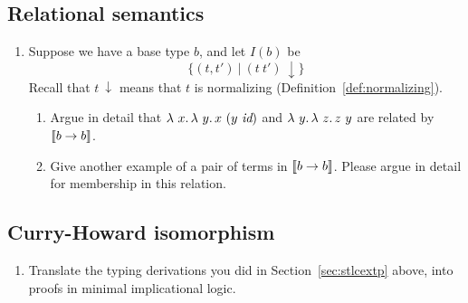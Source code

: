 \subsection{Relational semantics}

\begin{enumerate}
\item Suppose we have a base type $b$, and let $I(b)$ be
  \[
  \{ (t,t')\ |\ (t\ t')\ \downarrow \}
  \]
  \noindent Recall that $t\ \downarrow$ means that $t$ is normalizing (Definition~\ref{def:normalizing}).

  \begin{enumerate}
  \item Argue in detail that $\lambda\ x.\, \lambda\ y.\, x\ (y\ \textit{id})$ and $\lambda\ y.\, \lambda\ z.\, z\ y$
    are related by $\llbracket b \to b \rrbracket$.

  \item Give another example of a pair of terms in $\llbracket b \to b \rrbracket$.  Please argue in detail for membership in this relation.
  \end{enumerate}
\end{enumerate}

\subsection{Curry-Howard isomorphism}

\begin{enumerate}
\item Translate the typing derivations you did in Section~\ref{sec:stlcextp} above, into proofs in minimal implicational logic.
  \end{enumerate}
